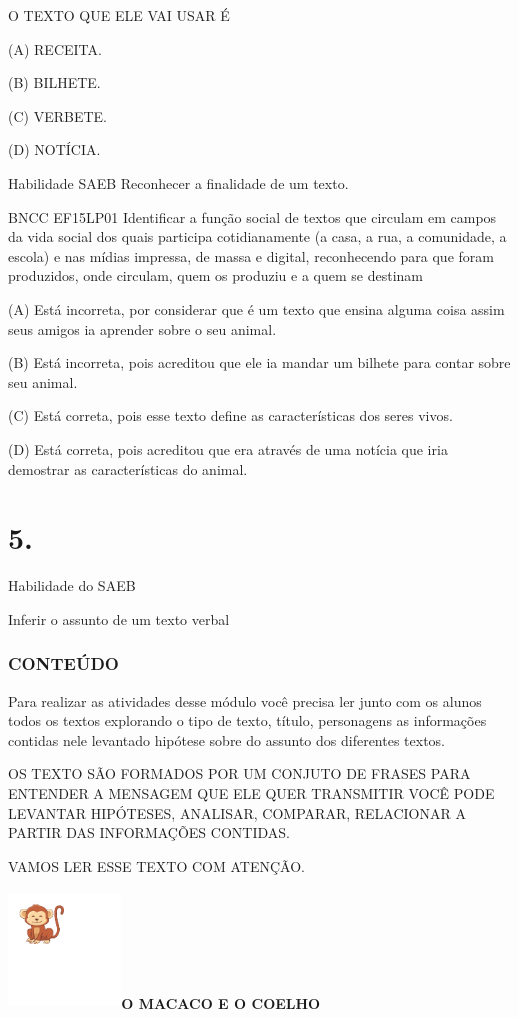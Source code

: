 {{O TEXTO QUE ELE VAI USAR É

(A) RECEITA.

(B) BILHETE.

(C) VERBETE.

(D) NOTÍCIA.

Habilidade SAEB Reconhecer a finalidade de um texto.

BNCC EF15LP01 Identificar a função social de textos que circulam em
campos da vida social dos quais participa cotidianamente (a casa, a rua,
a comunidade, a escola) e nas mídias impressa, de massa e digital,
reconhecendo para que foram produzidos, onde circulam, quem os produziu
e a quem se destinam

(A) Está incorreta, por considerar que é um texto que ensina alguma
coisa assim seus amigos ia aprender sobre o seu animal.

(B) Está incorreta, pois acreditou que ele ia mandar um bilhete para
contar sobre seu animal.

(C) Está correta, pois esse texto define as características dos seres
vivos.

(D) Está correta, pois acreditou que era através de uma notícia que iria
demostrar as características do animal.

\chapter{5.}

\protect\hypertarget{_Hlk129200547}{}{}Habilidade do SAEB
\protect\hypertarget{_Hlk128810826}{}{}

Inferir o assunto de um texto verbal

\subsection{CONTEÚDO}

Para realizar as atividades desse módulo você precisa ler junto com os
alunos todos os textos explorando o tipo de texto, título, personagens
as informações contidas nele levantado hipótese sobre do assunto dos
diferentes textos.

OS TEXTO SÃO FORMADOS POR UM CONJUTO DE FRASES PARA ENTENDER A MENSAGEM
QUE ELE QUER TRANSMITIR VOCÊ PODE LEVANTAR HIPÓTESES, ANALISAR,
COMPARAR, RELACIONAR A PARTIR DAS INFORMAÇÕES CONTIDAS.

VAMOS LER ESSE TEXTO COM ATENÇÃO.

\includegraphics[width=1.17910in,height=1.23722in]{media/image116.png}\textbf{O
MACACO E O COELHO}

}}

